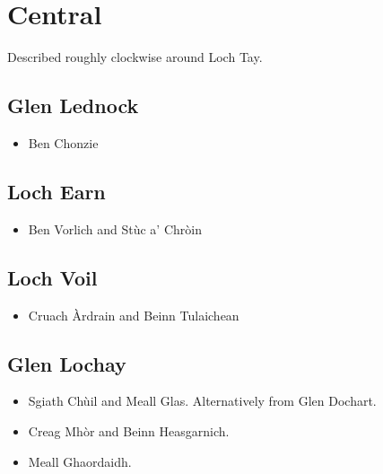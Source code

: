 
\section{Central}

Described roughly clockwise around Loch Tay.


\subsection{Glen Lednock}

\begin{itemize}
\item
Ben Chonzie
\end{itemize}


\subsection{Loch Earn}

\begin{itemize}
\item
Ben Vorlich and Stùc a' Chròin
\end{itemize}



\subsection{Loch Voil}

\begin{itemize}
\item
Cruach Àrdrain and Beinn Tulaichean
\end{itemize}


\subsection{Glen Lochay}

\begin{itemize}
\item
Sgiath Chùil and Meall Glas.  Alternatively from Glen Dochart.

\item
Creag Mhòr and Beinn Heasgarnich.

\item
Meall Ghaordaidh.
\end{itemize}

